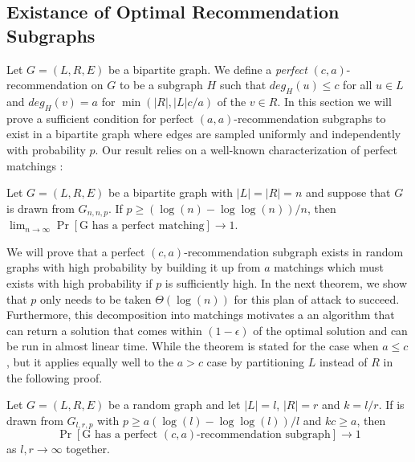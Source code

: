 \subsection{Existance of Optimal Recommendation Subgraphs}
Let $G=(L,R,E)$ be a bipartite graph. We define a \emph{perfect} $(c,a)$-recommendation on $G$ to be a subgraph $H$ such that $deg_H(u)\leq c$ for all $u\in L$ and $deg_H(v)=a$ for $\min(|R|,|L|c/a)$ of the $v\in R$. In this section we will prove a sufficient condition for perfect $(a,a)$-recommendation subgraphs to exist in a bipartite graph where edges are sampled uniformly and independently with probability $p$. Our result relies on a well-known characterization of perfect matchings \cite{Janson2011}:

\begin{thm}
\label{random_matching_threshold}
Let $G=(L,R,E)$ be a bipartite graph with $|L| = |R| = n$ and suppose that $G$ is drawn from $G_{n,n,p}$. If $p \geq (\log(n) - \log\log(n))/n$, then $\lim_{n\to\infty}\Pr[\text{G has a perfect matching}] \to 1$.
\end{thm}

We will prove that a perfect $(c,a)$-recommendation subgraph exists in random graphs with high probability by building it up from $a$ matchings which must exists with high probability if $p$ is sufficiently high. In the next theorem, we show that $p$ only needs to be taken $\Theta(\log(n))$ for this plan of attack to succeed. Furthermore, this decomposition into matchings motivates a an algorithm that can return a solution that comes within $(1-\epsilon)$ of the optimal solution and can be run in almost linear time. While the theorem is stated for the case when $a \leq c$, but it applies equally well to the $a > c$ case by partitioning $L$ instead of $R$ in the following proof.

\begin{thm}
Let $G=(L,R,E)$ be a random graph and let $|L|=l$, $|R|=r$ and $k=l/r$. If is drawn from $G_{l,r,p}$ with $p\geq a(\log(l)-\log\log(l))/l$ and $kc \geq a$, then 
\[ \Pr[\text{G has a perfect $(c,a)$-recommendation subgraph}] \to 1\]
as $l,r\to\infty$ together.
\end{thm}

